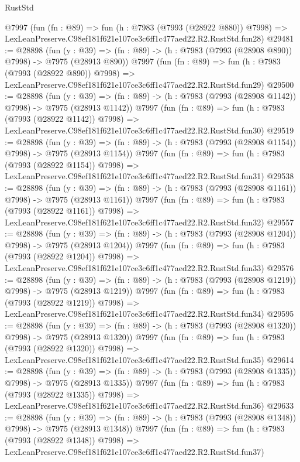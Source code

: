 \begin{lexlean}{RustStd}
\begin{coremodule}
    @7997
    (fun (fn : @89) =>
    fun (h : @7983 (@7993 (@28922 @880)) @7998) =>
    LexLeanPreserve.C98ef181f621e107ce3c6ff1c477aed22.R2.RustStd.fun28)
@29481 := @28898
    (fun (y : @39) => (fn : @89) -> (h : @7983 (@7993 (@28908 @890)) @7998) -> @7975 (@28913 @890))
    @7997
    (fun (fn : @89) =>
    fun (h : @7983 (@7993 (@28922 @890)) @7998) =>
    LexLeanPreserve.C98ef181f621e107ce3c6ff1c477aed22.R2.RustStd.fun29)
@29500 := @28898
    (fun (y : @39) =>
    (fn : @89) -> (h : @7983 (@7993 (@28908 @1142)) @7998) -> @7975 (@28913 @1142))
    @7997
    (fun (fn : @89) =>
    fun (h : @7983 (@7993 (@28922 @1142)) @7998) =>
    LexLeanPreserve.C98ef181f621e107ce3c6ff1c477aed22.R2.RustStd.fun30)
@29519 := @28898
    (fun (y : @39) =>
    (fn : @89) -> (h : @7983 (@7993 (@28908 @1154)) @7998) -> @7975 (@28913 @1154))
    @7997
    (fun (fn : @89) =>
    fun (h : @7983 (@7993 (@28922 @1154)) @7998) =>
    LexLeanPreserve.C98ef181f621e107ce3c6ff1c477aed22.R2.RustStd.fun31)
@29538 := @28898
    (fun (y : @39) =>
    (fn : @89) -> (h : @7983 (@7993 (@28908 @1161)) @7998) -> @7975 (@28913 @1161))
    @7997
    (fun (fn : @89) =>
    fun (h : @7983 (@7993 (@28922 @1161)) @7998) =>
    LexLeanPreserve.C98ef181f621e107ce3c6ff1c477aed22.R2.RustStd.fun32)
@29557 := @28898
    (fun (y : @39) =>
    (fn : @89) -> (h : @7983 (@7993 (@28908 @1204)) @7998) -> @7975 (@28913 @1204))
    @7997
    (fun (fn : @89) =>
    fun (h : @7983 (@7993 (@28922 @1204)) @7998) =>
    LexLeanPreserve.C98ef181f621e107ce3c6ff1c477aed22.R2.RustStd.fun33)
@29576 := @28898
    (fun (y : @39) =>
    (fn : @89) -> (h : @7983 (@7993 (@28908 @1219)) @7998) -> @7975 (@28913 @1219))
    @7997
    (fun (fn : @89) =>
    fun (h : @7983 (@7993 (@28922 @1219)) @7998) =>
    LexLeanPreserve.C98ef181f621e107ce3c6ff1c477aed22.R2.RustStd.fun34)
@29595 := @28898
    (fun (y : @39) =>
    (fn : @89) -> (h : @7983 (@7993 (@28908 @1320)) @7998) -> @7975 (@28913 @1320))
    @7997
    (fun (fn : @89) =>
    fun (h : @7983 (@7993 (@28922 @1320)) @7998) =>
    LexLeanPreserve.C98ef181f621e107ce3c6ff1c477aed22.R2.RustStd.fun35)
@29614 := @28898
    (fun (y : @39) =>
    (fn : @89) -> (h : @7983 (@7993 (@28908 @1335)) @7998) -> @7975 (@28913 @1335))
    @7997
    (fun (fn : @89) =>
    fun (h : @7983 (@7993 (@28922 @1335)) @7998) =>
    LexLeanPreserve.C98ef181f621e107ce3c6ff1c477aed22.R2.RustStd.fun36)
@29633 := @28898
    (fun (y : @39) =>
    (fn : @89) -> (h : @7983 (@7993 (@28908 @1348)) @7998) -> @7975 (@28913 @1348))
    @7997
    (fun (fn : @89) =>
    fun (h : @7983 (@7993 (@28922 @1348)) @7998) =>
    LexLeanPreserve.C98ef181f621e107ce3c6ff1c477aed22.R2.RustStd.fun37)

\end{coremodule}
\end{lexlean}

